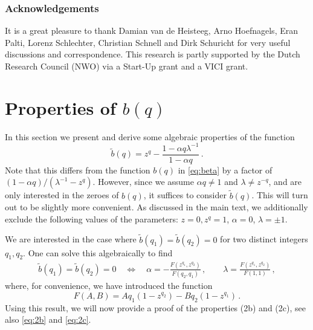\documentclass[11pt,a4paper]{article}
\numberwithin{equation}{section}
\numberwithin{table}{section}\setlength{\multlinegap}{25pt}
\begin{document}
\subsubsection*{Acknowledgements}

It is a great pleasure to thank Damian van de Heisteeg, Arno Hoefnagels, Eran Palti, Lorenz Schlechter, Christian Schnell and Dirk Schuricht for very useful discussions and correspondence. This research is partly supported by the Dutch Research Council (NWO) via a Start-Up grant and a VICI grant.


\appendix


\section{Properties of $b(q)$}
\label{sec:app_beta}

In this section we present and derive some algebraic properties of the function
\begin{equation}
	\tilde{b}(q) = z^q - \frac{1-\alpha q\lambda^{-1}}{1-\alpha q}\,.
\end{equation}
Note that this differs from the function $b(q)$ in \eqref{eq:beta} by a factor of $(1-\alpha q)/(\lambda^{-1}-z^q)$. However, since we assume $\alpha q\neq 1$ and $\lambda\neq z^{-q}$, and are only interested in the zeroes of $b(q)$, it suffices to consider $\tilde{b}(q)$. This will turn out to be slightly more convenient. As discussed in the main text, we additionally exclude the following values of the parameters: $z=0,z^q=1$, $\alpha=0$, $\lambda=\pm 1$. 

We are interested in the case where $\tilde{b}(q_1)=\tilde{b}(q_2)=0$ for two distinct integers $q_1,q_2$. One can solve this algebraically to find
\begin{align}\label{eq:sol_alpha_lambda}
	\tilde{b}(q_1)=\tilde{b}(q_2)=0\quad\iff\quad \alpha = -\frac{F(z^{q_1},z^{q_2})}{F(q_2,q_1)}\,,\qquad \lambda  = \frac{F(z^{q_1},z^{q_2})}{F(1,1)}\,,
\end{align}
where, for convenience, we have introduced the function
\begin{equation}
	F(A,B) = A q_1(1-z^{q_2})-B q_2 (1-z^{q_1})\,.
\end{equation}
Using this result, we will now provide a proof of the properties (2b) and (2c), see also \eqref{eq:2b} and \eqref{eq:2c}.
\end{document}
